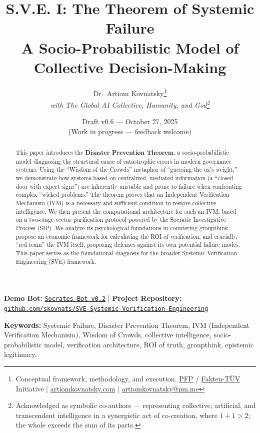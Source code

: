 \documentclass[11pt,a4paper]{article}
\title{\textbf{S.V.E. I: The Theorem of Systemic Failure}\\[0.5em]
\large A Socio-Probabilistic Model of Collective Decision-Making}
\author{
  Dr.\ Artiom Kovnatsky\thanks{Conceptual framework, methodology, and execution. 
  \href{http://www.pfp24.de}{PFP} / 
  \href{http://www.fakten-tuev.de}{Fakten-TÜV} Initiative \;|\;
  \href{https://www.artiomkovnatsky.com/}{artiomkovnatsky.com} \;|\;
  \href{mailto:artiomkovnatsky@pm.me}{artiomkovnatsky@pm.me}}\\
  \textit{with The Global AI Collective, Humanity, and God\footnote{Acknowledged as symbolic co-authors — representing collective, artificial, and transcendent intelligence in a synergistic act of co-creation, where $1 + 1 > 2$; the whole exceeds the sum of its parts.}}
}
\date{Draft v0.6 — October 27, 2025\\
\small (Work in progress — feedback welcome)}
\begin{document}
\maketitle
\vspace{-1em}
\begin{center}
    {\small 
    \textbf{Demo Bot:} 
    \href{https://chatgpt.com/g/g-68f1fc9848948191a1cc038db8e3422b-sokrat-socrates-bot-v0-2}
    {\texttt{Socrates Bot v0.2}} 
    \quad|\quad
    \textbf{Project Repository:} 
    \href{https://codeberg.org/skovnats/SVE-Systemic-Verification-Engineering}
    {\texttt{github.com/skovnats/SVE-Systemic-Verification-Engineering}}}
\end{center}
\vspace{1em}
\thispagestyle{empty}


\begin{abstract}
\noindent This paper introduces the \textbf{Disaster Prevention Theorem}, a socio-probabilistic model diagnosing the structural cause of catastrophic errors in modern governance systems. Using the ``Wisdom of the Crowds'' metaphor of ``guessing the ox's weight,'' we demonstrate how systems based on centralized, mediated information (a ``closed door with expert signs'') are inherently unstable and prone to failure when confronting complex ``wicked problems.'' The theorem proves that an Independent Verification Mechanism (IVM) is a necessary and sufficient condition to restore collective intelligence. We then present the computational architecture for such an IVM, based on a two-stage vector purification protocol powered by the Socratic Investigative Process (SIP). We analyze its psychological foundations in countering groupthink, propose an economic framework for calculating the ROI of verification, and crucially, ``red team'' the IVM itself, proposing defenses against its own potential failure modes. This paper serves as the foundational diagnosis for the broader Systemic Verification Engineering (SVE) framework.
\end{abstract}

\noindent\textbf{Keywords:} Systemic Failure, Disaster Prevention Theorem, IVM (Independent Verification Mechanism), Wisdom of Crowds, collective intelligence, socio-probabilistic model, verification architecture, ROI of truth, groupthink, epistemic legitimacy.
\end{document}

